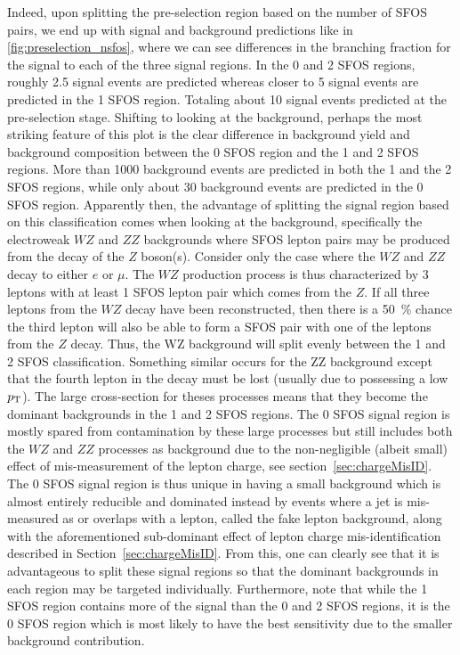 Indeed, upon splitting the pre-selection region based on the number of SFOS
pairs, we end up with signal and background predictions like in 
\fig\ref{fig:preselection_nsfos}, where we can see differences
in the branching fraction for the signal to each of the three signal regions.
In the 0 and 2 SFOS regions, roughly 2.5 signal events are predicted
whereas closer to 5 signal events are predicted in the 1 SFOS region. 
Totaling about 10 signal events predicted at the pre-selection stage.
Shifting to looking at the background, perhaps the most striking 
feature of this plot is the 
clear difference in background yield and background composition
between the 0 SFOS region and the 1 and 2 SFOS regions.
More than 1000 background events are predicted in both the 1 and
the 2 SFOS regions, while only about 30 background events are
predicted in the 0 SFOS region.
Apparently then, the advantage of splitting the signal region based on this
classification comes when looking at the background, specifically the
electroweak $WZ$ and $ZZ$ backgrounds where SFOS lepton pairs may be
produced from the decay of the $Z$ boson(s). Consider only the case
where the $WZ$ and $ZZ$ decay to either $e$ or $\mu$.  The $WZ$ production
process is thus characterized by 3 leptons with at least 1 SFOS lepton pair
which comes from the $Z$. If all three leptons from the $WZ$ decay have been
reconstructed, then there is a 50~\% chance the third lepton 
will also be able to form a SFOS pair with one of the leptons from the $Z$ decay.
Thus, the WZ background will split evenly between the 1 and 2 SFOS classification.
Something similar occurs for the ZZ background except that the fourth lepton 
in the decay must be lost (usually due to possessing a low $p_{\mathrm{T}}$).
The large cross-section for theses processes means that
they become the dominant backgrounds in the 1 and 2 SFOS regions.  
The 0 SFOS signal region is mostly spared from contamination  by 
these large processes but still
includes both the $WZ$ and $ZZ$ processes as background due to the
non-negligible (albeit small) effect of mis-measurement of the lepton
charge, see section~\ref{sec:chargeMisID}.  The 0 SFOS signal region
is thus unique in having a small background which is almost entirely
reducible and dominated instead by events where a jet is mis-measured
as or overlaps with a lepton, called the fake lepton background, along
with the aforementioned sub-dominant effect of lepton charge 
mis-identification described in Section~\ref{sec:chargeMisID}.  
From this, one can clearly see that it is
advantageous to split these signal regions so that the dominant
backgrounds in each region may be targeted individually.  Furthermore,
note that while the 1 SFOS region contains more of the signal than the
0 and 2 SFOS regions, it is the 0 SFOS region which is most likely to
have the best sensitivity due to the smaller background contribution.

